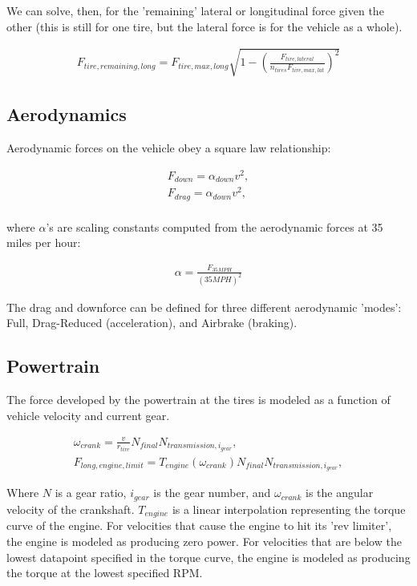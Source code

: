 \documentclass{article}
\begin{document}
We can solve, then, for the 'remaining' lateral or longitudinal force given the other (this is still for one tire, but the lateral force is for the vehicle as a whole).

\begin{align}
	F_{tire,remaining,long} = F_{tire,max,long} \sqrt{1-(\frac{F_{tire,lateral}}{n_{tires} F_{tire,max,lat}})^2} 
\end{align}

\subsection{Aerodynamics}

Aerodynamic forces on the vehicle obey a square law relationship:

\begin{align}
	F_{down} = \alpha_{down} v^2, \\
	F_{drag} = \alpha_{down} v^2, \\
\end{align}

where $\alpha$'s are scaling constants computed from the aerodynamic forces at 35 miles per hour:

\begin{align}
	\alpha = \frac{F_{35 MPH}}{(35 MPH)^2}
\end{align}

The drag and downforce can be defined for three different aerodynamic 'modes': Full, Drag-Reduced (acceleration), and Airbrake (braking).

\subsection{Powertrain}

The force developed by the powertrain at the tires is modeled as a function of vehicle velocity and current gear.

\begin{align}
	\omega_{crank} = \frac{v}{r_{tire}} N_{final} N_{transmission,i_{gear}}, \\
	F_{long,engine,limit} = T_{engine}(\omega_{crank}) N_{final} N_{transmission,i_{gear}},
\end{align}

Where $N$ is a gear ratio, $i_{gear}$ is the gear number, and $\omega_{crank}$ is the angular velocity of the crankshaft. $T_{engine}$ is a linear interpolation representing the torque curve of the engine. For velocities that cause the engine to hit its 'rev limiter', the engine is modeled as producing zero power. For velocities that are below the lowest datapoint specified in the torque curve, the engine is modeled as producing the torque at the lowest specified RPM.
\end{document}
